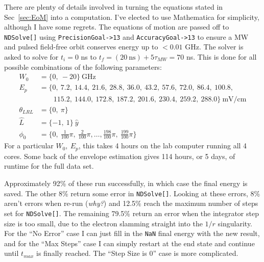 \documentclass[aps,pra,preprint,groupedaddress]{revtex4-1}
\begin{document}
There are plenty of details involved in turning the equations stated in Sec~\ref{sec:EoM} into a computation. I've elected to use Mathematica for simplicity, although I have some regrets. The equations of motion are passed off to \texttt{NDSolve[]} using \texttt{PrecisionGoal->13} and \texttt{AccuracyGoal->13} to ensure a MW and pulsed field-free orbit conserves energy up to $< 0.01$ GHz. The solver is asked to solve for $t_i = 0$ ns to $t_f = (20~\text{ns}) + 5\tau_{MW} = 70$ ns. This is done for all possible combinations of the following parameters:
\begin{align*}
W_0 & = \{0,~ -20\}~\text{GHz} \\
E_p & = \{0,~ 7.2,~ 14.4,~ 21.6,~ 28.8,~ 36.0,~ 43.2,~ 57.6,~ 72.0,~ 86.4,~ 100.8,~ \\
 & \quad \quad 115.2,~ 144.0,~ 172.8,~ 187.2,~ 201.6,~ 230.4,~ 259.2,~ 288.0\}~\text{mV/cm} \\
\theta_{LRL} & = \{0,~ \pi\} \\
\hat{L} & = \{-1,~ 1\}~\hat{y} \\
\phi_0 & = \{0,~ \frac{1}{100} \pi,~ \frac{2}{100} \pi, \ldots, \frac{198}{100} \pi,~ \frac{199}{100} \pi\}
\end{align*}
For a particular $W_0,~ E_p$, this takes 4 hours on the lab computer running all 4 cores. Some back of the envelope estimation gives 114 hours, or 5 days, of runtime for the full data set.

Approximately 92\% of these run successfully, in which case the final energy is saved. The other 8\% return some error in \texttt{NDSolve[]}. Looking at these errors, 8\% aren't errors when re-run (\emph{why?}) and 12.5\% reach the maximum number of steps set for \texttt{NDSolve[]}. The remaining 79.5\% return an error when the integrator step size is too small, due to the electron slamming straight into the $1/r$ singularity. For the ``No Error'' case I can just fill in the \texttt{NaN} final energy with the new result, and for the ``Max Steps'' case I can simply restart at the end state and continue until $t_{max}$ is finally reached. The ``Step Size is 0'' case is more complicated.
\end{document}
